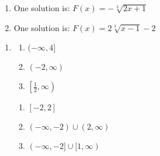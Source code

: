 \documentclass{ximera}
\begin{document}
\begin{multicols}{2}
\begin{enumerate}
\setcounter{enumi}{\value{HW}}

\item One solution is:  $F(x) = -\sqrt[3]{2x+1}$

\item One solution is:  $F(x) =2\sqrt[3]{x-1}-2$

\setcounter{HW}{\value{enumi}}
\end{enumerate}
\end{multicols}

\begin{enumerate}
\setcounter{enumi}{\value{HW}}

\item 

\begin{multicols}{3}

\begin{enumerate}

\item   $(-\infty, 4]$  \vphantom{$\left[ \frac{1}{2}, \infty \right)$}

\item   $(-2, \infty)$ \vphantom{$\left[ \frac{1}{2}, \infty \right)$}

\item $\left[ \frac{1}{2}, \infty \right)$

\setcounter{HWindent}{\value{enumii}}

\end{enumerate}
\end{multicols}

\begin{multicols}{3}

\begin{enumerate}
\setcounter{enumii}{\value{HWindent}}

\item   $[-2,2]$

\item   $(-\infty, -2) \cup (2, \infty)$

\item   $(-\infty, -2] \cup [1, \infty)$

\end{enumerate}

\end{multicols}

\setcounter{HW}{\value{enumi}}
\end{enumerate}
\end{document}
